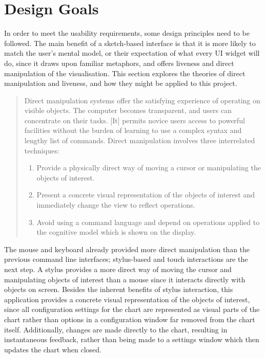 	\section{Design Goals}
	In order to meet the usability requirements, some design principles need to be followed. The main benefit of a sketch-based interface is that it is more likely to match the user's mental model, or their expectation of what every UI widget will do, since it draws upon familiar metaphors, and offers liveness and direct manipulation of the visualisation. This section explores the theories of direct manipulation and liveness, and how they might be applied to this project.
	
	\begin{quote}
	Direct manipulation systems offer the satisfying experience of operating on visible objects. The computer becomes transparent, and users can concentrate on their tasks. [It] permits novice users access to powerful facilities without the burden of learning to use a complex syntax and lengthy list of commands. Direct manipulation involves three interrelated techniques: 
		\begin{enumerate}
			\item Provide a physically direct way of moving a cursor or manipulating the objects of interest.
			\item Present a concrete visual representation of the objects of interest and immediately change the view to reflect operations.
			\item Avoid using a command language and depend on operations applied to the cognitive model which is shown on the display.
		\end{enumerate}			
	\end{quote}
	\begin{flushright}
	\citep{shneiderman_direct_1983}
	\end{flushright}
	
	The mouse and keyboard already provided more direct manipulation than the previous command line interfaces; stylus-based and touch interactions are the next step. A stylus provides a more direct way of moving the cursor and manipulating objects of interest than a mouse since it interacts directly with objects on screen. 
	Besides the inherent benefits of stylus interaction, this application provides a concrete visual representation of the objects of interest, since all configuration settings for the chart are represented as visual parts of the chart rather than options in a configuration window far removed from the chart itself. Additionally, changes are made directly to the chart, resulting in instantaneous feedback, rather than being made to a settings window which then updates the chart when closed.
	
